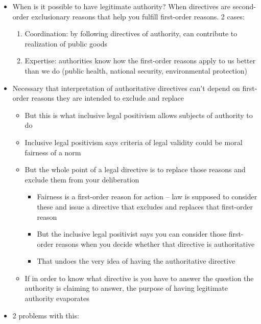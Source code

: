 \begin{itemize}
\tightlist
\item
  When is it possible to have legitimate authority? When directives are
  second-order exclusionary reasons that help you fulfill first-order
  reasons. 2 cases:

  \begin{enumerate}
  \def\labelenumi{\arabic{enumi}.}
  \tightlist
  \item
    Coordination: by following directives of authority, can contribute
    to realization of public goods
  \item
    Expertise: authorities know how the first-order reasons apply to us
    better than we do (public health, national security, environmental
    protection)
  \end{enumerate}
\item
  Necessary that interpretation of authoritative directives can't depend
  on first-order reasons they are intended to exclude and replace

  \begin{itemize}
  \tightlist
  \item
    But this is what inclusive legal positivism allows subjects of
    authority to do
  \item
    Inclusive legal positivism says criteria of legal validity could be
    moral fairness of a norm
  \item
    But the whole point of a legal directive is to replace those reasons
    and exclude them from your deliberation

    \begin{itemize}
    \tightlist
    \item
      Fairness is a first-order reason for action -- law is supposed to
      consider these and issue a directive that excludes and replaces
      that first-order reason
    \item
      But the inclusive legal positivist says you can consider those
      first-order reasons when you decide whether that directive is
      authoritative
    \item
      That undoes the very idea of having the authoritative directive
    \end{itemize}
  \item
    If in order to know what directive is you have to answer the
    question the authority is claiming to answer, the purpose of having
    legitimate authority evaporates
  \end{itemize}
\item
  2 problems with this:


\end{itemize}
